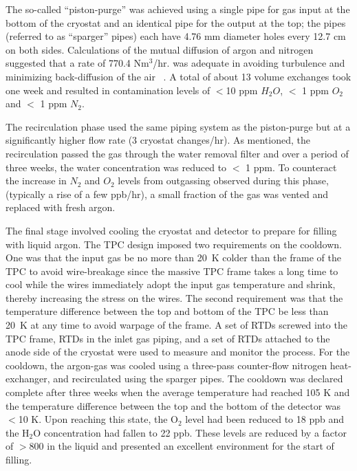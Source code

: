 The so-called ``piston-purge'' was achieved using a single pipe for gas input at the bottom of the cryostat and an identical pipe for the output at the top; the pipes (referred to as ``sparger'' pipes) each have 4.76 mm diameter holes every 12.7 cm on both sides.  Calculations of the mutual diffusion of argon and nitrogen suggested that a rate of 770.4 Nm$^3$/hr. was adequate in avoiding turbulence and minimizing back-diffusion of the air ~\cite{voirin}. A total of about 13 volume exchanges took one week and resulted in contamination levels of $<$10 ppm $H_2 O$, $<$ 1 ppm $O_2$ and $<$ 1 ppm $N_2$. 

The recirculation phase used the same piping system as the piston-purge but at a significantly higher flow rate (3 cryostat changes/hr). As mentioned, the recirculation passed the gas through the water removal filter and over a period of three weeks, the water concentration was reduced to $<$ 1 ppm. To counteract the increase in $N_2$ and $O_2$ levels from outgassing observed during this phase, (typically a rise of a few ppb/hr), a small fraction of the gas was vented and replaced with fresh argon. 

The final stage involved cooling the cryostat and detector to prepare for filling with liquid argon. The TPC design imposed two requirements on the cooldown. One was that  the input gas be no more than 20~K colder than the frame of the TPC to avoid wire-breakage since the massive TPC frame takes a long time to cool while the wires immediately adopt the input gas temperature and shrink,  thereby increasing the stress on the wires.  The second requirement was that the temperature difference between the top and bottom of the TPC be less than 20~K at any time to avoid warpage of the frame.  A set of RTDs screwed into the TPC frame, RTDs in the inlet gas piping, and a set of RTDs attached to the anode side of the cryostat were used to measure and monitor the process. For the cooldown, the argon-gas was cooled using a three-pass counter-flow nitrogen heat-exchanger, and recirculated using the sparger pipes. The cooldown was declared complete after three weeks when the average temperature had reached 105 K and the temperature difference between the top and the bottom of the detector was $<$10 K. Upon reaching this state, the O$_2$ level had been reduced to 18 ppb and the H$_2$O concentration had fallen to 22 ppb. These levels are reduced by a factor of $>$800 in the liquid and presented an excellent environment for the start of filling.

